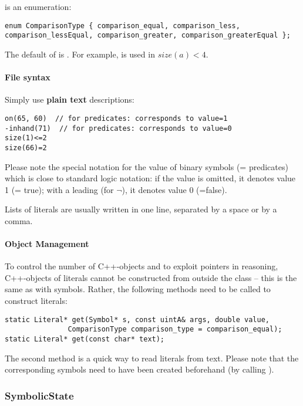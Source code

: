 \documentclass[10pt,twoside,twocolumn,fleqn]{article}
\begin{document}
 is an enumeration:
\begin{lstlisting}
enum ComparisonType { comparison_equal, comparison_less,
comparison_lessEqual, comparison_greater, comparison_greaterEqual };
\end{lstlisting}
The default of  is . For
example,  is used in $size(a)<4$.



\paragraph{File syntax}

Simply use \textbf{plain text} descriptions:
\begin{lstlisting}
on(65, 60)  // for predicates: corresponds to value=1
-inhand(71)  // for predicates: corresponds to value=0
size(1)<=2
size(66)=2
\end{lstlisting}
Please note the special notation for the value of binary symbols (=
predicates) which is close to standard logic notation: if the value is
omitted, it denotes value 1 (= true); with a leading \code{-} (for $\neg$),
it denotes value 0 (=false).

Lists of literals are usually written in one line, separated by a space
or by a comma.


\paragraph{Object Management}

To control the number of C++-objects and to exploit pointers in
reasoning, C++-objects of literals cannot be constructed from outside
the class -- this is the same as with symbols. Rather, the following
methods need to be called to construct literals:   
\begin{lstlisting}
static Literal* get(Symbol* s, const uintA& args, double value,
               ComparisonType comparison_type = comparison_equal);
static Literal* get(const char* text);
\end{lstlisting}
The second method is a quick way to read literals from text. Please
note that the corresponding symbols need to have been created
beforehand (by calling ).


\subsubsection{SymbolicState}
\end{document}
